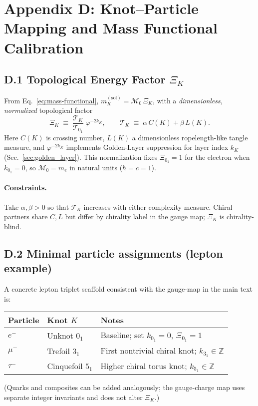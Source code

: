 \section*{Appendix D: Knot–Particle Mapping and Mass Functional Calibration}
\label{sec:knot-particle-mapping}

\subsection*{D.1 Topological Energy Factor \texorpdfstring{\(\Xi_K\)}{XiK}}
From Eq.~\eqref{eq:mass-functional},
\(m_K^{(\mathrm{sol})}=\mathcal{M}_0\,\Xi_K\),
with a \emph{dimensionless, normalized} topological factor
\begin{equation}
 \Xi_K \;\equiv\; \frac{\mathcal{T}_K}{\mathcal{T}_{0_1}}\;\varphi^{-2k_K},
 \qquad \mathcal{T}_K \;\equiv\; \alpha\,C(K) + \beta\,L(K).
 \label{eq:Xi-normalized}
\end{equation}
Here \(C(K)\) is crossing number, \(L(K)\) a dimensionless ropelength-like tangle measure, and \(\varphi^{-2k_K}\) implements Golden-Layer suppression for layer index \(k_K\) (Sec.~\ref{sec:golden_layer}). This normalization fixes
\(\Xi_{0_1}=1\) for the electron when \(k_{0_1}=0\), so \(\mathcal{M}_0=m_e\) in natural units (\(\hbar=c=1\)).

\paragraph{Constraints.}
Take \(\alpha,\beta>0\) so that \(\mathcal{T}_K\) increases with either complexity measure.
Chiral partners share \(C,L\) but differ by chirality label in the gauge map; \(\Xi_K\) is chirality-blind.

\subsection*{D.2 Minimal particle assignments (lepton example)}
A concrete lepton triplet scaffold consistent with the gauge-map in the main text is:
\begin{center}
 \begin{tabular}{lll}
 \toprule
 Particle & Knot \(K\) & Notes \\
 \midrule
        \(e^-\)  & Unknot \(0_1\) & Baseline; set \(k_{0_1}=0\), \(\Xi_{0_1}=1\) \\
        \(\mu^-\) & Trefoil \(3_1\) & First nontrivial chiral knot; \(k_{3_1}\in\mathbb{Z}\) \\
        \(\tau^-\) & Cinquefoil \(5_1\) & Higher chiral torus knot; \(k_{5_1}\in\mathbb{Z}\) \\
        \bottomrule
    \end{tabular}
\end{center}
(Quarks and composites can be added analogously; the gauge-charge map uses separate integer invariants and does not alter \(\Xi_K\).)


